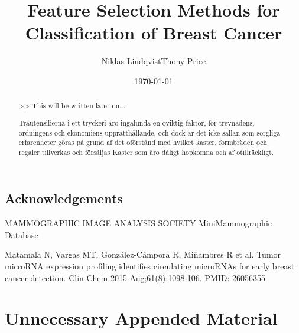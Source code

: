 \documentclass{kththesis}
\title{Feature Selection Methods for Classification of Breast Cancer}
\author{Niklas Lindqvist\newline Thony Price}
\date{\today}
\begin{document}
\frontmatter
\titlepage



\begin{abstract}
  >> This will be written later on...

  \blindtext
\end{abstract}



\begin{otherlanguage}{swedish}
  \begin{abstract}

  Träutensilierna i ett tryckeri äro ingalunda en oviktig faktor,
  för trevnadens, ordningens och ekonomiens upprätthållande, och
  dock är det icke sällan som sorgliga erfarenheter göras på grund
  af det oförstånd med hvilket kaster, formbräden och regaler
  tillverkas och försäljas Kaster som äro dåligt hopkomna och af
  otillräckligt.

  \end{abstract}

\end{otherlanguage}



\section*{Acknowledgements}

MAMMOGRAPHIC IMAGE ANALYSIS SOCIETY MiniMammographic Database


Matamala N, Vargas MT, González-Cámpora R, Miñambres R et al. Tumor microRNA expression profiling identifies circulating microRNAs for early breast cancer detection. Clin Chem 2015 Aug;61(8):1098-106. PMID: 26056355




\tableofcontents
\mainmatter

















\printbibliography[heading=bibintoc] %

\appendix
\chapter{Unnecessary Appended Material}
\end{document}
